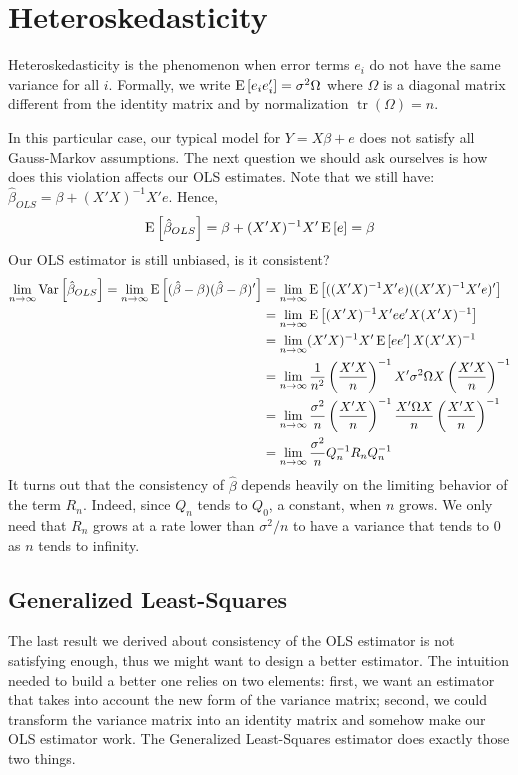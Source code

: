 \section{Heteroskedasticity}

Heteroskedasticity is the phenomenon when error terms $e_i$ do not have the same variance for all $i$. Formally, we write $\operatorname{E}\left[e_ie_i'\right] = \sigma^2\Omega$ where $\Omega$ is a diagonal matrix different from the identity matrix and by normalization $\operatorname{tr}(\Omega) = n$.

In this particular case, our typical model for $Y = X\beta +e$ does not satisfy all Gauss-Markov assumptions. The next question we should ask ourselves is how does this violation affects our OLS estimates. Note that we still have: $\hat\beta_{OLS} = \beta + (X'X)^{-1}X'e$. Hence, $$\operatorname{E}\left[\hat\beta_{OLS}\right] = \beta + (X'X)^{-1}X'\operatorname{E}\left[e\right] = \beta $$ Our OLS estimator is still unbiased, is it consistent?\begin{align*}
\lim_{n\to\infty} \operatorname{Var}\left[\hat{\beta}_{OLS}\right] = \lim_{n\to\infty}\operatorname{E}\left[(\hat\beta - \beta)(\hat\beta - \beta)'\right] & = \lim_{n\to\infty}\operatorname{E}\left[((X'X)^{-1}X'e)((X'X)^{-1}X'e)'\right] \\ 
& = \lim_{n\to\infty}\operatorname{E}\left[(X'X)^{-1}X'ee'X(X'X)^{-1}\right] \\ & = \lim_{n\to\infty}(X'X)^{-1}X'\operatorname{E}\left[ee'\right]X(X'X)^{-1} \\ 
& = \lim_{n\to\infty}\frac{1}{n^2}\left(\frac{X'X}{n}\right)^{-1}X'\sigma^2\Omega X\left( \frac{X'X}{n}\right)^{-1} \\ 
& = \lim_{n\to\infty}\frac{\sigma^2}{n}\left(\frac{X'X}{n}\right)^{-1}\frac{X'\Omega X}{n}\left(\frac{X'X}{n}\right)^{-1} \\ 
& = \lim_{n\to\infty}\frac{\sigma^2}{n}Q_n^{-1}R_n Q_n^{-1}
\end{align*} It turns out that the consistency of $\hat\beta$ depends heavily on the limiting behavior of the term $R_n$. Indeed, since $Q_n$ tends to $Q_0$, a constant, when $n$ grows. We only need that $R_n$ grows at a rate lower than $\sigma^2/n$ to have a variance that tends to $0$ as $n$ tends to infinity.

\subsection{Generalized Least-Squares}

The last result we derived about consistency of the OLS estimator is not satisfying enough, thus we might want to design a better estimator. The intuition needed to build a better one relies on two elements: first, we want an estimator that takes into account the new form of the variance matrix; second, we could transform the variance matrix into an identity matrix and somehow make our OLS estimator work. The Generalized Least-Squares estimator does exactly those two things.

